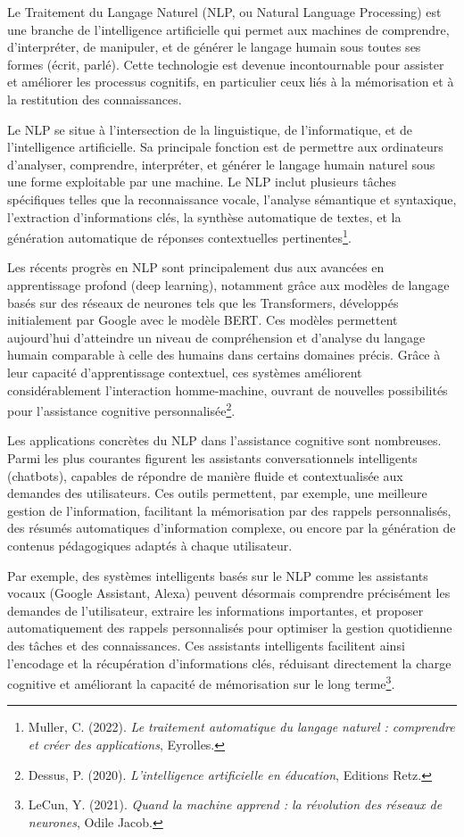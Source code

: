 \documentclass[11pt,a4paper]{report}
\begin{document}
Le Traitement du Langage Naturel (NLP, ou Natural Language Processing) est une branche de l’intelligence artificielle qui permet aux machines de comprendre, d’interpréter, de manipuler, et de générer le langage humain sous toutes ses formes (écrit, parlé). Cette technologie est devenue incontournable pour assister et améliorer les processus cognitifs, en particulier ceux liés à la mémorisation et à la restitution des connaissances.

Le NLP se situe à l’intersection de la linguistique, de l’informatique, et de l’intelligence artificielle. Sa principale fonction est de permettre aux ordinateurs d'analyser, comprendre, interpréter, et générer le langage humain naturel sous une forme exploitable par une machine. Le NLP inclut plusieurs tâches spécifiques telles que la reconnaissance vocale, l'analyse sémantique et syntaxique, l'extraction d'informations clés, la synthèse automatique de textes, et la génération automatique de réponses contextuelles pertinentes\footnote{Muller, C. (2022). \textit{Le traitement automatique du langage naturel : comprendre et créer des applications}, Eyrolles.}.

Les récents progrès en NLP sont principalement dus aux avancées en apprentissage profond (deep learning), notamment grâce aux modèles de langage basés sur des réseaux de neurones tels que les Transformers, développés initialement par Google avec le modèle BERT. Ces modèles permettent aujourd’hui d'atteindre un niveau de compréhension et d’analyse du langage humain comparable à celle des humains dans certains domaines précis. Grâce à leur capacité d'apprentissage contextuel, ces systèmes améliorent considérablement l'interaction homme-machine, ouvrant de nouvelles possibilités pour l’assistance cognitive personnalisée\footnote{Dessus, P. (2020). \textit{L’intelligence artificielle en éducation}, Editions Retz.}.

Les applications concrètes du NLP dans l’assistance cognitive sont nombreuses. Parmi les plus courantes figurent les assistants conversationnels intelligents (chatbots), capables de répondre de manière fluide et contextualisée aux demandes des utilisateurs. Ces outils permettent, par exemple, une meilleure gestion de l’information, facilitant la mémorisation par des rappels personnalisés, des résumés automatiques d’information complexe, ou encore par la génération de contenus pédagogiques adaptés à chaque utilisateur.

Par exemple, des systèmes intelligents basés sur le NLP comme les assistants vocaux (Google Assistant, Alexa) peuvent désormais comprendre précisément les demandes de l’utilisateur, extraire les informations importantes, et proposer automatiquement des rappels personnalisés pour optimiser la gestion quotidienne des tâches et des connaissances. Ces assistants intelligents facilitent ainsi l’encodage et la récupération d'informations clés, réduisant directement la charge cognitive et améliorant la capacité de mémorisation sur le long terme\footnote{LeCun, Y. (2021). \textit{Quand la machine apprend : la révolution des réseaux de neurones}, Odile Jacob.}.
\end{document}
